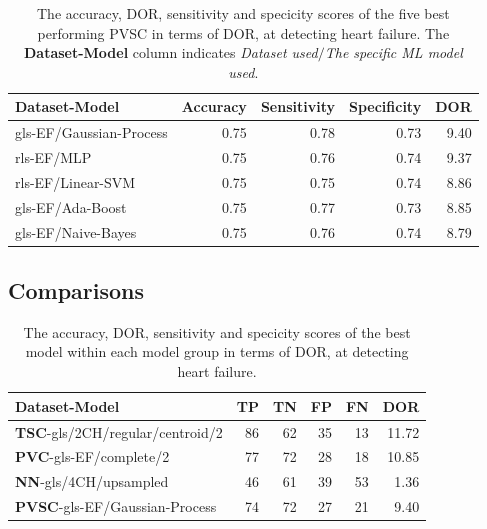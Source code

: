 \begin{table}
    \centering
    \begin{tabular}{lrrrr}
        \toprule
        Dataset-Model           &  Accuracy &  Sensitivity &  Specificity &  DOR \\
        \midrule
        gls-EF/Gaussian-Process &      0.75 &         0.78 &         0.73 & 9.40 \\
        rls-EF/MLP              &      0.75 &         0.76 &         0.74 & 9.37 \\
        rls-EF/Linear-SVM       &      0.75 &         0.75 &         0.74 & 8.86 \\
        gls-EF/Ada-Boost        &      0.75 &         0.77 &         0.73 & 8.85 \\
        gls-EF/Naive-Bayes      &      0.75 &         0.76 &         0.74 & 8.79 \\
        \bottomrule
    \end{tabular}
    \caption{The accuracy, DOR, sensitivity and specicity scores of the five best performing PVSC in terms of DOR, at detecting heart failure.
             The \textbf{Dataset-Model} column indicates \textit{Dataset used}$/$\textit{The specific ML model used}.}
    \label{tab:pvmlc_hf_dor_sens_spec_dis}
\end{table}

\clearpage
\subsection{Comparisons}

\begin{table}
    \centering
    \begin{tabular}{lrrrrr}
        \toprule
        Dataset-Model                            &  TP &  TN &  FP &  FN &  DOR \\
        \midrule
        \textbf{TSC}-gls/2CH/regular/centroid/2  &  86 &  62 &  35 &  13 & 11.72 \\
        \textbf{PVC}-gls-EF/complete/2           &  77 &  72 &  28 &  18 & 10.85 \\
        \textbf{NN}-gls/4CH/upsampled            &  46 &  61 &  39 &  53 & 1.36 \\
        \textbf{PVSC}-gls-EF/Gaussian-Process    &  74 &  72 &  27 &  21 & 9.40 \\
        \bottomrule
    \end{tabular}
    \caption{The accuracy, DOR, sensitivity and specicity scores of the best model within each model group in terms of DOR, at detecting heart failure.}
    \label{tab:hf_compare}
\end{table}

\newpage

